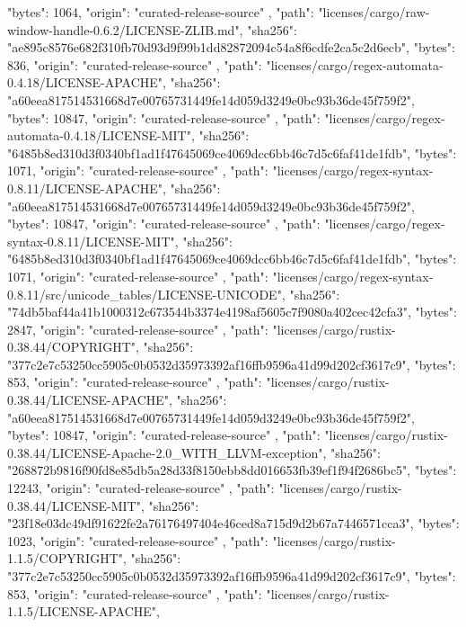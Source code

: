 {{      "bytes": 1064,
      "origin": "curated-release-source"
    },
    {
      "path": "licenses/cargo/raw-window-handle-0.6.2/LICENSE-ZLIB.md",
      "sha256": "ae895c8576e682f310fb70d93d9f99b1dd82872094c54a8f6cdfe2ca5c2d6ecb",
      "bytes": 836,
      "origin": "curated-release-source"
    },
    {
      "path": "licenses/cargo/regex-automata-0.4.18/LICENSE-APACHE",
      "sha256": "a60eea817514531668d7e00765731449fe14d059d3249e0bc93b36de45f759f2",
      "bytes": 10847,
      "origin": "curated-release-source"
    },
    {
      "path": "licenses/cargo/regex-automata-0.4.18/LICENSE-MIT",
      "sha256": "6485b8ed310d3f0340bf1ad1f47645069ce4069dcc6bb46c7d5c6faf41de1fdb",
      "bytes": 1071,
      "origin": "curated-release-source"
    },
    {
      "path": "licenses/cargo/regex-syntax-0.8.11/LICENSE-APACHE",
      "sha256": "a60eea817514531668d7e00765731449fe14d059d3249e0bc93b36de45f759f2",
      "bytes": 10847,
      "origin": "curated-release-source"
    },
    {
      "path": "licenses/cargo/regex-syntax-0.8.11/LICENSE-MIT",
      "sha256": "6485b8ed310d3f0340bf1ad1f47645069ce4069dcc6bb46c7d5c6faf41de1fdb",
      "bytes": 1071,
      "origin": "curated-release-source"
    },
    {
      "path": "licenses/cargo/regex-syntax-0.8.11/src/unicode_tables/LICENSE-UNICODE",
      "sha256": "74db5baf44a41b1000312c673544b3374e4198af5605c7f9080a402cec42cfa3",
      "bytes": 2847,
      "origin": "curated-release-source"
    },
    {
      "path": "licenses/cargo/rustix-0.38.44/COPYRIGHT",
      "sha256": "377c2e7c53250cc5905c0b0532d35973392af16ffb9596a41d99d202cf3617c9",
      "bytes": 853,
      "origin": "curated-release-source"
    },
    {
      "path": "licenses/cargo/rustix-0.38.44/LICENSE-APACHE",
      "sha256": "a60eea817514531668d7e00765731449fe14d059d3249e0bc93b36de45f759f2",
      "bytes": 10847,
      "origin": "curated-release-source"
    },
    {
      "path": "licenses/cargo/rustix-0.38.44/LICENSE-Apache-2.0_WITH_LLVM-exception",
      "sha256": "268872b9816f90fd8e85db5a28d33f8150ebb8dd016653fb39ef1f94f2686bc5",
      "bytes": 12243,
      "origin": "curated-release-source"
    },
    {
      "path": "licenses/cargo/rustix-0.38.44/LICENSE-MIT",
      "sha256": "23f18e03dc49df91622fe2a76176497404e46ced8a715d9d2b67a7446571cca3",
      "bytes": 1023,
      "origin": "curated-release-source"
    },
    {
      "path": "licenses/cargo/rustix-1.1.5/COPYRIGHT",
      "sha256": "377c2e7c53250cc5905c0b0532d35973392af16ffb9596a41d99d202cf3617c9",
      "bytes": 853,
      "origin": "curated-release-source"
    },
    {
      "path": "licenses/cargo/rustix-1.1.5/LICENSE-APACHE",
}}
